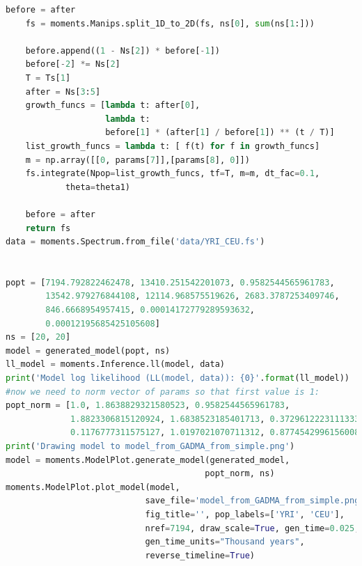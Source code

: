 \documentclass[12pt]{article}
\begin{document}
\begin{appendices}
\begin{lstlisting}[language=Python]
	before = after
	fs = moments.Manips.split_1D_to_2D(fs, ns[0], sum(ns[1:]))

	before.append((1 - Ns[2]) * before[-1])
	before[-2] *= Ns[2]
	T = Ts[1]
	after = Ns[3:5]
	growth_funcs = [lambda t: after[0], 
	                lambda t: 
	                before[1] * (after[1] / before[1]) ** (t / T)]
	list_growth_funcs = lambda t: [ f(t) for f in growth_funcs]
	m = np.array([[0, params[7]],[params[8], 0]])
	fs.integrate(Npop=list_growth_funcs, tf=T, m=m, dt_fac=0.1,
	        theta=theta1)

	before = after
	return fs
data = moments.Spectrum.from_file('data/YRI_CEU.fs')


popt = [7194.792822462478, 13410.251542201073, 0.9582544565961783,
        13542.979276844108, 12114.968575519626, 2683.3787253409746,
        846.6668954957415, 0.00014172779289593632, 
        0.00012195685425105608]
ns = [20, 20]
model = generated_model(popt, ns)
ll_model = moments.Inference.ll(model, data)
print('Model log likelihood (LL(model, data)): {0}'.format(ll_model))
#now we need to norm vector of params so that first value is 1:
popt_norm = [1.0, 1.8638829321580523, 0.9582544565961783,
             1.8823306815120924, 1.6838523185401713, 0.3729612223111333, 
             0.1176777311575127, 1.0197021070711312, 0.8774542996156008]
print('Drawing model to model_from_GADMA_from_simple.png')
model = moments.ModelPlot.generate_model(generated_model, 
                                        popt_norm, ns)
moments.ModelPlot.plot_model(model,
                            save_file='model_from_GADMA_from_simple.png',
                            fig_title='', pop_labels=['YRI', 'CEU'],
                            nref=7194, draw_scale=True, gen_time=0.025,
                            gen_time_units="Thousand years",
                            reverse_timeline=True)
\end{lstlisting}
\end{appendices}



\end{document}
